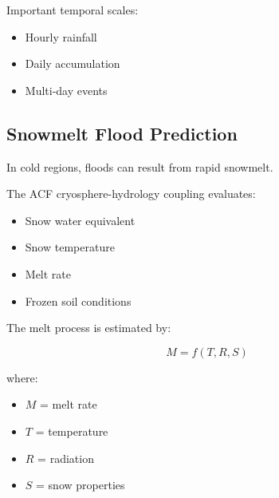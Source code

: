 Important temporal scales:

\begin{itemize}

\item Hourly rainfall

\item Daily accumulation

\item Multi-day events

\end{itemize}



\subsection{Snowmelt Flood Prediction}

In cold regions, floods can result from rapid snowmelt.

The ACF cryosphere-hydrology coupling evaluates:

\begin{itemize}

\item Snow water equivalent

\item Snow temperature

\item Melt rate

\item Frozen soil conditions

\end{itemize}


The melt process is estimated by:

\[
M=f(T,R,S)
\]

where:

\begin{itemize}

\item $M$ = melt rate

\item $T$ = temperature

\item $R$ = radiation

\item $S$ = snow properties

\end{itemize}


